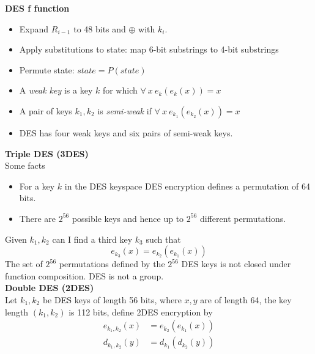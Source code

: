\textbf{DES f function}
\begin{center}
    \desf
\end{center}
\begin{itemize}
    \item Expand $R_{i−1}$ to 48 bits and $\oplus$ with $k_i$.
    \item Apply substitutions to state: map 6-bit substrings to 4-bit substrings
    \item Permute state: $state = P(state)$
\end{itemize}

\begin{itemize}
    \item A \textit{weak key} is a key $k$ for which $\forall\ x\ e_k(e_k(x)) = x$
    \item A pair of keys $k_1, k_2$ is \textit{semi-weak} if $\forall\ x\ e_{k_1} (e_{k_2}(x)) = x$
    \item DES has four weak keys and six pairs of semi-weak keys.
\end{itemize}

\textbf{Triple DES (3DES)}\\
Some facts
\begin{itemize}
    \item For a key $k$ in the DES keyspace DES encryption defines a permutation of 64 bits.
    \item There are $2^{56}$ possible keys and hence up to $2^{56}$ different permutations.
\end{itemize}
Given $k_1, k_2$ can I find a third key $k_3$ such that
$$e_{k_3}(x) = e_{k_2}(e_{k_1}(x))$$
The set of $2^{56}$ permutations defined by the $2^{56}$ DES keys is not closed under function composition.
DES is not a group.\\

\textbf{Double DES (2DES)}\\
Let $k_1, k_2$ be DES keys of length 56 bits,
where $x, y$ are of length 64, the key length $(k_1,k_2)$ is 112 bits,
define 2DES encryption by
\begin{align*}
    e_{k_1,k_2}(x) &= e_{k_2}(e_{k_1}(x)) \\
    d_{k_1,k_2}(y) &= d_{k_1}(d_{k_2}(y))
\end{align*}


